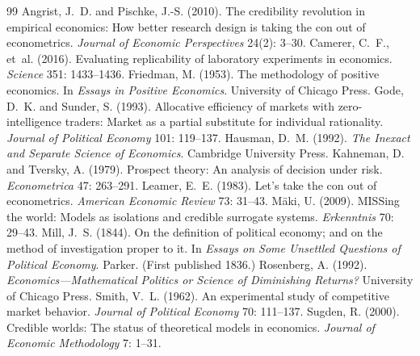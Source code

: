 \documentclass{situationist-preprint}
\begin{document}
\begin{thebibliography}{99}\small
{} Angrist, J.~D. and Pischke, J.-S. (2010). The credibility revolution in empirical economics: How better research design is taking the con out of econometrics. \emph{Journal of Economic Perspectives} 24(2): 3--30.
 Camerer, C.~F., et~al. (2016). Evaluating replicability of laboratory experiments in economics. \emph{Science} 351: 1433--1436.
 Friedman, M. (1953). The methodology of positive economics. In \emph{Essays in Positive Economics}. University of Chicago Press.
 Gode, D.~K. and Sunder, S. (1993). Allocative efficiency of markets with zero-intelligence traders: Market as a partial substitute for individual rationality. \emph{Journal of Political Economy} 101: 119--137.
 Hausman, D.~M. (1992). \emph{The Inexact and Separate Science of Economics}. Cambridge University Press.
 Kahneman, D. and Tversky, A. (1979). Prospect theory: An analysis of decision under risk. \emph{Econometrica} 47: 263--291.
 Leamer, E.~E. (1983). Let's take the con out of econometrics. \emph{American Economic Review} 73: 31--43.
 M\"aki, U. (2009). MISSing the world: Models as isolations and credible surrogate systems. \emph{Erkenntnis} 70: 29--43.
 Mill, J.~S. (1844). On the definition of political economy; and on the method of investigation proper to it. In \emph{Essays on Some Unsettled Questions of Political Economy}. Parker. (First published 1836.)
 Rosenberg, A. (1992). \emph{Economics---Mathematical Politics or Science of Diminishing Returns?} University of Chicago Press.
 Smith, V.~L. (1962). An experimental study of competitive market behavior. \emph{Journal of Political Economy} 70: 111--137.
 Sugden, R. (2000). Credible worlds: The status of theoretical models in economics. \emph{Journal of Economic Methodology} 7: 1--31.
\end{thebibliography}
\end{document}
